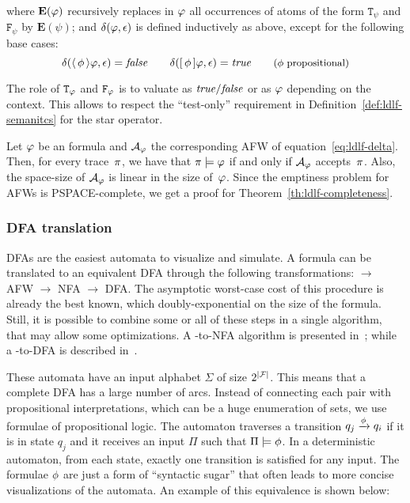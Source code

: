 \endgroup
where $\mathbf{E}(\varphi)$ recursively replaces in $\varphi$ all
occurrences of atoms of the form $\mathtt{T}_\psi$ and $\mathtt{F}_\psi$ by
$\mathbf{E}(\psi)$; and $\delta(\varphi, \epsilon)$ is defined inductively as
above, except for the following base cases:
\begin{equation*}
	\delta(\langle\, {\phi} \,\rangle\varphi, \epsilon) = \text{\textit{false}} \qquad
	\delta([\, {\phi} \,]\varphi, \epsilon) = \text{\textit{true}} \qquad
	\text{\small ($\phi$ propositional)}
\end{equation*}

The role of $\mathtt{T}_\varphi$ and $\mathtt{F}_\varphi$ is to valuate as
$\text{\textit{true}}/\text{\textit{false}}$ or as $\varphi$ depending on the context. This allows to
respect the ``test-only'' requirement in Definition~\ref{def:ldlf-semanitcs}
for the star operator.

Let $\varphi$ be an \ldl{} formula and $\mathcal{A}_\varphi$ the corresponding
AFW of equation~\ref{eq:ldlf-delta}. Then, for every trace~$\pi$, we have
that $\pi \models \varphi$ if and only if $\mathcal{A}_\varphi$
accepts~$\pi$. Also, the space-size of $\mathcal{A}_\varphi$ is linear in the
size of~$\varphi$. Since the emptiness problem for AFWs is PSPACE-complete,
we get a proof for Theorem~\vref{th:ldlf-completeness}.


\subsubsection*{DFA translation}

DFAs are the easiest automata to visualize and simulate. A \ldl{} formula can
be translated to an equivalent DFA through the following transformations:
\ldl{} $\to$ AFW $\to$ NFA $\to$ DFA. The asymptotic worst-case cost of this
procedure is already the best known, which doubly-exponential on the size of
the formula. Still, it is possible to combine some or all of these steps in a
single algorithm, that may allow some optimizations. A \ldl{}-to-NFA algorithm
is presented in~\cite{bib:degiacomo-logic-nmrdp}; while a \ldl{}-to-DFA is
described in~\cite{bib:favorito-thesis}.

These automata have an input alphabet $\Sigma$ of size $2^{\lvert\mathcal{F}\rvert}$.
This means that a complete DFA has a large number of arcs. Instead of
connecting each pair with propositional interpretations, which can be a huge
enumeration of sets, we use formulae of propositional logic. The automaton
traverses a transition $q_j \xrightarrow{\phi} q_i$ if it is in state
$q_j$ and it receives an input $\Pi$ such that $\Pi \models \phi$.
In a deterministic automaton, from each state, exactly one transition is
satisfied for any input. The formulae $\phi$ are just a form of
``syntactic sugar'' that often leads to more concise visualizations of the
automata. An example of this equivalence is shown below:

